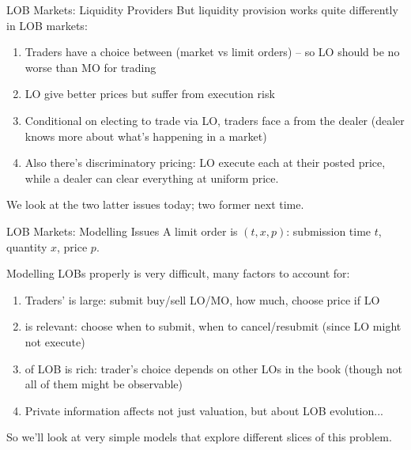 \documentclass[english,10pt
,aspectratio=169
]{beamer}
\begin{document}
\begin{frame}{LOB Markets: Liquidity Providers}
	But \alert{liquidity provision} works quite differently in LOB markets:
	\begin{enumerate}
		\item Traders have a choice between  (market vs limit orders) -- so LO should be no worse than MO for trading
		\item LO give better prices but suffer from execution risk
		\item Conditional on electing to trade via LO, traders face a  from the dealer (dealer knows more about what's happening in a market)
		\item Also there's discriminatory pricing: LO execute each at their posted price, while a dealer can clear everything at uniform price.
	\end{enumerate}
	We look at the two latter issues today; two former next time.
\end{frame}


\begin{frame}{LOB Markets: Modelling Issues}
	A limit order is $(t,x,p)$: submission time $t$, quantity $x$, price $p$.
	
	Modelling LOBs properly is very difficult, many factors to account for:
	\begin{enumerate}
		\item Traders'  is large: submit buy/sell LO/MO, how much, choose price if LO
		\item {} is relevant: choose when to submit, when to cancel/resubmit (since LO might not execute)
		\item {} of LOB is rich: trader's choice depends on other LOs in the book (though not all of them might be observable)
		\item Private information affects not just valuation, but  about LOB evolution...
	\end{enumerate}
	So we'll look at very simple models that explore different slices of this problem.
\end{frame}
\end{document}

